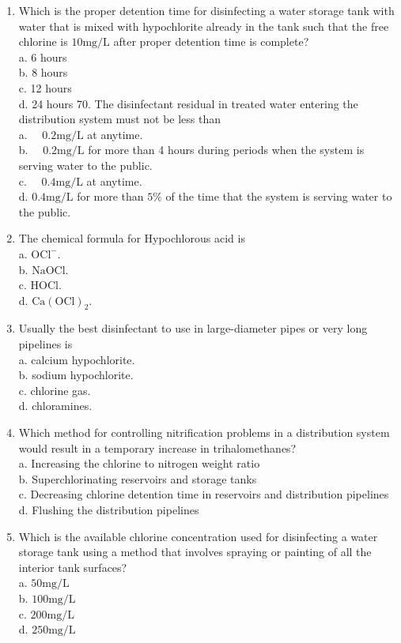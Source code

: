 \documentclass[10pt]{article}
\begin{document}
\begin{enumerate}
  \item Which is the proper detention time for disinfecting a water storage tank with water that is mixed with hypochlorite already in the tank such that the free chlorine is $10 \mathrm{mg} / \mathrm{L}$ after proper detention time is complete?\\
a. 6 hours\\
b. 8 hours\\
c. 12 hours\\
d. 24 hours 70. The disinfectant residual in treated water entering the distribution system must not be less than\\
a. $\quad 0.2 \mathrm{mg} / \mathrm{L}$ at anytime.\\
b. $\quad 0.2 \mathrm{mg} / \mathrm{L}$ for more than 4 hours during periods when the system is serving water to the public.\\
c. $\quad 0.4 \mathrm{mg} / \mathrm{L}$ at anytime.\\
d. $0.4 \mathrm{mg} / \mathrm{L}$ for more than $5 \%$ of the time that the system is serving water to the public.

  \item The chemical formula for Hypochlorous acid is\\
a. $\mathrm{OCl}^{-}$.\\
b. $\mathrm{NaOCl}$.\\
c. $\mathrm{HOCl}$.\\
d. $\mathrm{Ca}(\mathrm{OCl})_{2}$.

  \item Usually the best disinfectant to use in large-diameter pipes or very long pipelines is\\
a. calcium hypochlorite.\\
b. sodium hypochlorite.\\
c. chlorine gas.\\
d. chloramines.

  \item Which method for controlling nitrification problems in a distribution system would result in a temporary increase in trihalomethanes?\\
a. Increasing the chlorine to nitrogen weight ratio\\
b. Superchlorinating reservoirs and storage tanks\\
c. Decreasing chlorine detention time in reservoirs and distribution pipelines\\
d. Flushing the distribution pipelines

  \item Which is the available chlorine concentration used for disinfecting a water storage tank using a method that involves spraying or painting of all the interior tank surfaces?\\
a. $50 \mathrm{mg} / \mathrm{L}$\\
b. $100 \mathrm{mg} / \mathrm{L}$\\
c. $200 \mathrm{mg} / \mathrm{L}$\\
d. $250 \mathrm{mg} / \mathrm{L}$


\end{enumerate}
\end{document}
